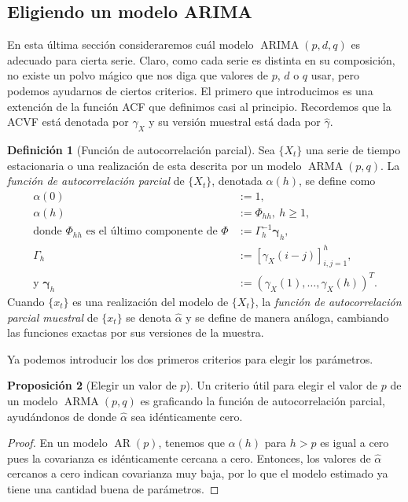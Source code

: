 \documentclass[11pt,letterpaper]{article}
\newcommand{\AR}{\ensuremath{\operatorname{AR}}}
\newcommand{\ARMA}{\ensuremath{\operatorname{ARMA}}}
\newcommand{\ARIMA}{\ensuremath{\operatorname{ARIMA}}}
\theoremstyle{definition}
\newtheorem{definition}{Definición}[section]
\theoremstyle{theorem}
\newtheorem{proposition}[definition]{Proposición}
\theoremstyle{remark}
\begin{document}
	\subsection{Eligiendo un modelo ARIMA}
	\noindent\justify En esta última sección consideraremos cuál modelo \(\ARIMA(p,d,q)\) es adecuado para cierta serie. Claro, como cada serie es distinta en su composición, no existe un polvo mágico que nos diga que valores de \(p\), \(d\) o \(q\) usar, pero podemos ayudarnos de ciertos criterios. El primero que introducimos es una extención de la función ACF que definimos casi al principio. Recordemos que la ACVF está denotada por \(\gamma_X \) y su versión muestral está dada por \(\hat{\gamma}\).
	\begin{definition}[Función de autocorrelación parcial]
		Sea \(\{X_t\}\) una serie de tiempo estacionaria o una realización de esta descrita por un modelo \(\ARMA(p,q)\). La \textit{función de autocorrelación parcial} de \(\{X_t\}\), denotada \(\alpha(h)\), se define como
		\begin{align*}
			\alpha(0)&:=1, \\
			\alpha(h)&:=\Phi_{hh},\ h\geq1, \\
			\mbox{donde }\Phi_{hh}\mbox{ es el último componente de }\Phi&:=\Gamma_h^{-1}\boldsymbol{\gamma}_h, \\
			\Gamma_h&:=[\gamma_X(i-j)]_{i,j=1}^h, \\
			\mbox{y }\boldsymbol{\gamma}_h&:=(\gamma_X(1),\dots,\gamma_X(h))^T.
		\end{align*}
		Cuando \(\{x_t\}\) es una realización del modelo de \(\{X_t\}\), la \textit{función de autocorrelación parcial muestral} de \(\{x_t\}\) se denota \(\hat{\alpha}\) y se define de manera análoga, cambiando las funciones exactas por sus versiones de la muestra.
	\end{definition}
	Ya podemos introducir los dos primeros criterios para elegir los parámetros.
	\begin{proposition}[Elegir un valor de \(p\)]
		Un criterio útil para elegir el valor de \(p\) de un modelo \(\ARMA(p,q)\) es graficando la {\rm función de autocorrelación parcial}, ayudándonos de donde \(\hat{\alpha}\) sea idénticamente cero.
	\end{proposition}
	\begin{proof}
		En un modelo \(\AR(p)\), tenemos que \(\alpha(h)\) para \(h>p\) es igual a cero pues la covarianza es idénticamente cercana a cero. Entonces, los valores de \(\hat{\alpha}\) cercanos a cero indican covarianza muy baja, por lo que el modelo estimado ya tiene una cantidad buena de parámetros.
	\end{proof}
\end{document}
